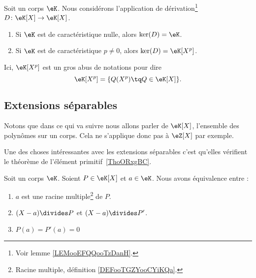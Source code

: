 \begin{lemma}     \label{LEMooFNFYooAfIPRT}
	Soit un corps \( \eK\). Nous considérons l'application de dérivation\footnote{Voir lemme \ref{LEMooEFQQooTzDanH}.} \( D\colon \eK[X]\to \eK[X]\).
	\begin{enumerate}
		\item
		      Si \( \eK\) est de caractéristique nulle, alors \( \ker(D)=\eK\).
		\item
		      Si \( \eK\) est de caractéristique \( p\neq 0\), alors \( \ker(D)=\eK[X^p]\).
	\end{enumerate}
	Ici, \( \eK[X^p]\) est un gros abus de notations pour dire
	\begin{equation}
		\eK[X^p]=\{ Q(X^p)\tq Q\in \eK[X] \}.
	\end{equation}
\end{lemma}

\subsection{Extensions séparables}

Notons que dans ce qui va suivre nous allons parler de \( \eK[X]\), l'ensemble des polynômes sur un corps. Cela ne s'applique donc pas à \( \eZ[X]\) par exemple.

Une des choses intéressantes avec les extensions séparables c'est qu'elles vérifient le théorème de l'élément primitif~\ref{ThoORxgBC}.

\begin{lemma}     \label{LEMooGUUJooDSrQFU}
	Soit un corps \( \eK\). Soient \( P\in \eK[X]\) et \( a\in \eK\). Nous avons équivalence entre :
	\begin{enumerate}
		\item       \label{ITEMooHMMMooWKzSLA}
		      \( a\) est une racine multiple\footnote{Racine multiple, définition \ref{DEFooTGZYooCYiKQa}.} de \( P\).
		\item       \label{ITEMooZXCTooPctrMm}
		      \( (X-a)\divides P\) et \( (X-a)\divides P'\).
		\item       \label{ITEMooBMSSooNOYfKn}
		      \( P(a)=P'(a)=0\)
	\end{enumerate}
\end{lemma}

